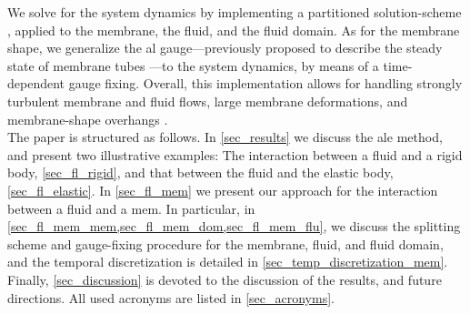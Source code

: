 We solve for the system dynamics by  implementing a partitioned solution-scheme \cite{felippaPartitionedAnalysisCoupled2001}, applied to the membrane, the fluid, and the fluid domain. As for the membrane shape, we generalize the \ac{al} gauge---previously proposed to describe the steady state of membrane tubes \cite{derenyiFormationInteractionMembrane2002}---to the system dynamics, by means of a time-dependent gauge fixing. Overall, this implementation allows for handling strongly turbulent membrane and fluid flows, large membrane deformations, and membrane-shape overhangs \cite{worthmullerIRENEFluIdLayeR2025}.\vspace{0.5cm}\\

The paper is structured as follows. In \cref{sec_results} we discuss the \ac{ale} method, and present two illustrative examples: The interaction between a fluid and a rigid body,  \cref{sec_fl_rigid}, and that between  the fluid and the elastic body, \cref{sec_fl_elastic}. In \cref{sec_fl_mem} we present our approach for the interaction between a fluid and a \acl{mem}. In particular, in \cref{sec_fl_mem_mem,sec_fl_mem_dom,sec_fl_mem_flu}, we discuss the splitting scheme and gauge-fixing procedure for the membrane, fluid, and fluid domain, and the temporal discretization is detailed in \cref{sec_temp_discretization_mem}. Finally, \cref{sec_discussion} is devoted to the discussion of the results, and future directions. All used acronyms  are listed in \cref{sec_acronyms}.